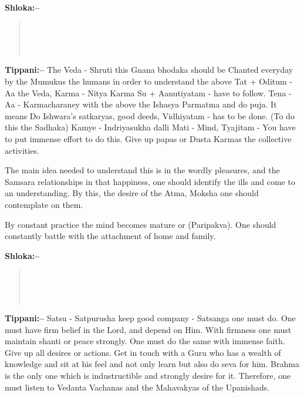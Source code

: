\textbf{Shloka:–}

\begin{verse}
 \\\\\\ 
\end{verse}

\textbf{Tippani:–} The Veda - Shruti this Gnana bhodaka should be Chanted everyday by the Mumukus the humans in order to understand the above Tat + Oditum - Aa the Veda, Karma - Nitya Karma Su + Aanutiyatam - have to follow. Tena - Aa - Karmacharaney with the above the Ishasya Parmatma and do puja. It means Do Ishwara's satkaryas, good deeds, Vidhiyatam - has to be done. (To do this the Sadhaka) Kamye - Indriyasukha dalli Mati - Mind, Tyajitam - You have to put immense effort to do this. Give up papas or Dusta Karmas the collective activities.

The main idea needed to understand this is in the wordly pleasures, and the Samsara relationships in that happiness, one should identify the ills and come to an understanding. By this, the desire of the Atma, Moksha one should contemplate on them.

\newpage

By constant practice the mind becomes mature or (Paripakva). One should constantly battle with the attachment of home and family.

\textbf{Shloka:–}

\begin{verse}
 \\\\\\ 
\end{verse}

\textbf{Tippani:–} Satsu - Satpurusha keep good company - Satsanga one must do. One must have firm belief in the Lord, and depend on Him. With firmness one must maintain shanti or peace strongly. One must do the same with immense faith. Give up all desires or actions. Get in touch with a Guru who has a wealth of knowledge and sit at his feel and not only learn but also do seva for him. Brahma is the only one which is industructible and strongly desire for it. Therefore, one must listen to Vedanta Vachanas and the Mahavakyas of the Upanishads.

